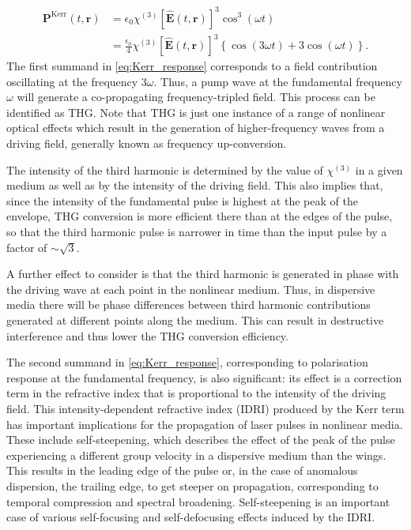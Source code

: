 \documentclass[a4paper]{jpconf}
\begin{document}
\begin{align}\label{eq:Kerr_response}
\nonumber  \mathbf{P}^\text{Kerr}(t,\mathbf{r}) &= \epsilon_0 \chi^{(3)} [\hat{\mathbf{E}}(t, \mathbf{r})]^3 \cos^3(\omega t) \\ &= \frac{\epsilon_0}{4}  \chi^{(3)} [\hat{\mathbf{E}}(t, \mathbf{r})]^3 \left\{ \cos (3\omega t) +  3 \cos(\omega t)\right\}.
\end{align}
The first summand in \eqref{eq:Kerr_response} corresponds to a field contribution oscillating at the frequency $3 \omega$. Thus, a pump wave at the fundamental frequency $\omega$ will generate a co-propagating frequency-tripled field. This process can be identified as THG. Note that THG is just one instance of a range of nonlinear optical effects which result in the generation of higher-frequency waves from a driving field, generally known as frequency up-conversion. \par 
The intensity of the third harmonic is determined by the value of $\chi^{(3)}$ in a given medium as well as by the intensity of the driving field. This also implies that, since the intensity of the fundamental pulse is highest at the peak of the envelope, THG conversion is more efficient there than at the edges of the pulse, so that the third harmonic pulse is narrower in time than the input pulse by a factor of $\sim\sqrt{3}$. \par 
 A further effect to consider is that the third harmonic is generated in phase with the driving wave at each point in the nonlinear medium. Thus, in dispersive media there will be phase differences between third harmonic contributions generated at different points along the medium. This can result in destructive interference and thus lower the THG conversion efficiency. \par 
The second summand in \eqref{eq:Kerr_response}, corresponding to polarisation response at the fundamental frequency, is also significant: its effect is a correction term in the refractive index that is proportional to the intensity of the driving field. This intensity-dependent refractive index (IDRI) produced by the Kerr term has important implications for the propagation of laser pulses in nonlinear media. These include self-steepening, which describes the effect of the peak of the pulse experiencing a different group velocity in a dispersive medium than the wings. This results in the leading edge of the pulse or, in the case of anomalous dispersion, the trailing edge, to get steeper on propagation, corresponding to temporal compression and spectral broadening. Self-steepening is an important case of various self-focusing and self-defocusing effects induced by the IDRI. \par 
\end{document}
